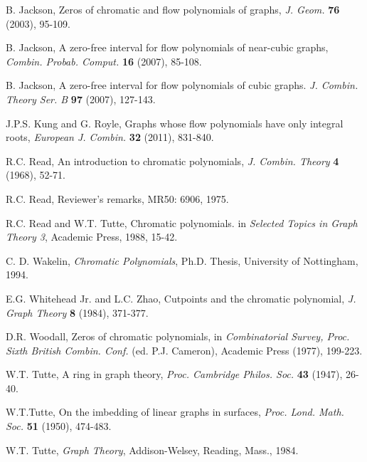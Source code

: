\documentclass[11pt]{article}
\begin{document}
\begin{thebibliography}{99}
 B. Jackson, Zeros of chromatic and 
flow polynomials of graphs, 
{\it J. Geom.} {\bf 76} (2003), 
95-109. 

B. Jackson, A zero-free interval for flow polynomials of near-cubic graphs, 
{\it Combin. Probab. Comput.}
{\bf 16} (2007),  85-108.

B. Jackson, 
A zero-free interval for flow polynomials of cubic graphs. 
{\it J. Combin. Theory Ser. B} 
{\bf 97} (2007),  127-143. 

 J.P.S. Kung and G. Royle,
Graphs whose flow polynomials have only integral roots,
{\it European J. Combin.}
{\bf 32} (2011), 831-840.

R.C. Read, An introduction to chromatic polynomials,
{\it J. Combin.  Theory} {\bf 4} (1968), 52-71. 

 R.C. Read, 
Reviewer's remarks, MR50: 6906, 1975.

R.C. Read and W.T. Tutte, 
Chromatic polynomials. 
in {\it Selected Topics in Graph Theory 3}, 
Academic Press, 1988, 15-42.


C. D. Wakelin, 
{\it Chromatic Polynomials}, Ph.D. Thesis, University of Nottingham, 1994.

E.G. Whitehead Jr. and L.C. Zhao, 
Cutpoints and the chromatic polynomial, 
{\it J. Graph Theory} 
{\bf 8} (1984), 371-377.

 D.R. Woodall, 
Zeros of chromatic polynomials, in
{\it Combinatorial Survey, Proc. Sixth British 
Combin. Conf.}
(ed. P.J. Cameron), Academic Press (1977), 199-223.


W.T. Tutte,
A ring in graph theory,
{\it Proc. Cambridge Philos. Soc.}
{\bf 43} (1947), 26-40.

W.T.Tutte,
On the imbedding of linear graphs in surfaces,
{\it Proc. Lond. Math. Soc.}
{\bf 51} (1950), 474-483.


 W.T. Tutte,
{\it Graph Theory}, 
Addison-Welsey, Reading, Mass., 1984.
\end{thebibliography}
\end{document}
